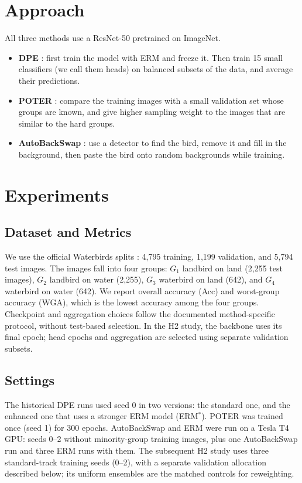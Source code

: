\documentclass[runningheads]{llncs}
\begin{document}
\section{Approach}
All three methods use a ResNet-50 pretrained on ImageNet.
\begin{itemize}
    \item \textbf{DPE} \cite{dpe}: first train the model with ERM and freeze it. Then train 15 small classifiers (we call them heads) on balanced subsets of the data, and average their predictions.
    \item \textbf{POTER} \cite{poter}: compare the training images with a small validation set whose groups are known, and give higher sampling weight to the images that are similar to the hard groups.
    \item \textbf{AutoBackSwap} \cite{autobackswap}: use a detector to find the bird, remove it and fill in the background, then paste the bird onto random backgrounds while training.
\end{itemize}

\section{Experiments}

\subsection{Dataset and Metrics}
We use the official Waterbirds splits \cite{waterbirds}: 4,795 training, 1,199 validation, and 5,794 test images. The images fall into four groups:
$G_1$ landbird on land (2,255 test images),
$G_2$ landbird on water (2,255),
$G_3$ waterbird on land (642), and
$G_4$ waterbird on water (642).
We report overall accuracy (Acc) and worst-group accuracy (WGA), which is the lowest accuracy among the four groups. Checkpoint and aggregation choices follow the documented method-specific protocol, without test-based selection. In the H2 study, the backbone uses its final epoch; head epochs and aggregation are selected using separate validation subsets.

\subsection{Settings}
The historical DPE runs used seed 0 in two versions: the standard one, and the enhanced one that uses a stronger ERM model (ERM$^*$). POTER was trained once (seed 1) for 300 epochs. AutoBackSwap and ERM were run on a Tesla T4 GPU: seeds 0--2 without minority-group training images, plus one AutoBackSwap run and three ERM runs with them. The subsequent H2 study uses three standard-track training seeds (0--2), with a separate validation allocation described below; its uniform ensembles are the matched controls for reweighting.
\end{document}
